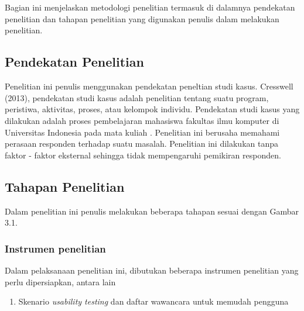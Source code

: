 \chapter{\babTiga}
Bagian ini menjelaskan metodologi penelitian termasuk di dalamnya pendekatan penelitian dan tahapan penelitian yang digunakan penulis dalam melakukan penelitian.
\section{Pendekatan Penelitian}

Penelitian ini penulis menggunakan pendekatan peneltian studi kasus. Cresswell (2013), pendekatan studi kasus adalah penelitian tentang suatu program, peristiwa, aktivitas, proses, atau kelompok individu.
\linebreak\linebreak
Pendekatan studi kasus yang dilakukan adalah proses pembelajaran mahasiswa fakultas ilmu komputer di Universitas Indonesia pada mata kuliah {\ddp}. Penelitian ini berusaha memahami perasaan responden terhadap suatu masalah. Penelitian ini dilakukan tanpa faktor - faktor eksternal sehingga tidak mempengaruhi pemikiran responden.

\section{Tahapan Penelitian}

Dalam penelitian ini penulis melakukan beberapa tahapan sesuai dengan Gambar 3.1.
\

\subsection{Instrumen penelitian}

Dalam pelaksanaan penelitian ini, dibutukan beberapa instrumen penelitian yang perlu dipersiapkan, antara lain
\begin{enumerate}
	\item Skenario \textit{usability testing} dan daftar wawancara untuk memudah pengguna
\end{enumerate}


